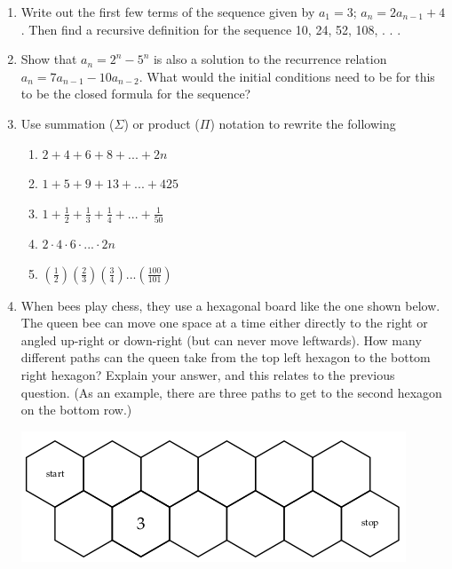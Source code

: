 \documentclass[11pt, a4paper]{article}
\newcommand\setItemNumber[1]{\setcounter{enumi}{\numexpr#1-1\relax}}
\begin{document}
\begin{enumerate}
            \setItemNumber{7}
            \item Write out the first few terms of the sequence given by $a_1 = 3$; $a_n = 2a_{n - 1} + 4$. Then find a recursive definition for the sequence 10, 24, 52, 108, . . .


            \setItemNumber{10}
        \item Show that $a_n = 2^n - 5^n$ is also a solution to the recurrence relation $a_n = {7a_{n - 1}} - {10a_{n - 2}}$. What would the initial conditions need to be for this to be the closed formula for the sequence?


            \setItemNumber{13}
        \item Use summation ($\Sigma$) or product ($\Pi$) notation to rewrite the following
            \begin{enumerate}

                \item $2 + 4 + 6 + 8 + ... + 2n$
                \item $1 + 5 + 9 + 13 + ... + 425$
                \item $1 + \frac{1}{2} + \frac{1}{3} + \frac{1}{4} + ... + \frac{1}{50}$
                \item $2\cdot 4\cdot 6\cdot ... \cdot2n$
                \item $(\frac{1}{2})(\frac{2}{3})(\frac{3}{4})...(\frac{100}{101})$
            \end{enumerate}

            \setItemNumber{18}
            \item When bees play chess, they use a hexagonal board like the one shown below. The queen bee can move one space at a time either directly to the right or angled up-right or down-right (but can never move leftwards). How many different paths can the queen take from the top left hexagon to the bottom right hexagon? Explain your answer, and this relates to the previous question. (As an example, there are three paths to get to the second hexagon on the bottom row.)

            \begin{center}
            \includegraphics[width=.5\textwidth]{hw6_graphic1}
            \end{center}
	
        \end{enumerate}
\end{document}
